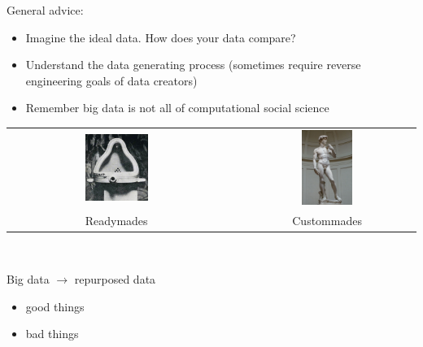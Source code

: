 \documentclass[aspectratio=169]{beamer}
\def\vf{\vfill}
\begin{document}
\begin{frame}

General advice:
\begin{itemize}
\item Imagine the ideal data.  How does your data compare?
\pause
\item Understand the data generating process (sometimes require reverse engineering goals of data creators)
\pause
\item Remember big data is not all of computational social science
\end{itemize}

\end{frame}
\begin{frame}

\begin{center}
\begin{tabular}{ccc}
\includegraphics[width=0.30\textwidth]{figures/duchamp_fountain} & \phantom{12345} & \includegraphics[width=0.30\textwidth]{figures/michelangelo_david} \\
\LARGE{Readymades} &  & \LARGE{Custommades}
\end{tabular}
\end{center}

\vf
\vspace{0.5in}
\\

\end{frame}
\begin{frame}

Big data $\rightarrow$ repurposed data
\pause
\begin{itemize}
\item good things
\item bad things
\end{itemize}

\end{frame}
\end{document}
